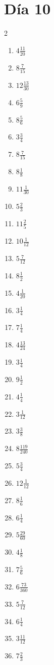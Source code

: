 \documentclass[12pt]{article}
\begin{document}
\section*{Día 10}
\begin{multicols}{2}\begin{enumerate}
\item $ 4 \frac{11}{20} $
\item $ 8 \frac{7}{15} $
\item $ 12 \frac{13}{30} $
\item $ 6 \frac{5}{9} $
\item $ 8 \frac{5}{6} $
\item $ 3 \frac{3}{4} $
\item $ 8 \frac{7}{15} $
\item $ 8 \frac{1}{8} $
\item $ 11 \frac{1}{30} $
\item $ 5 \frac{2}{3} $
\item $ 11 \frac{2}{5} $
\item $ 10 \frac{1}{12} $
\item $ 5 \frac{7}{12} $
\item $ 8 \frac{1}{2} $
\item $ 4 \frac{1}{20} $
\item $ 3 \frac{1}{4} $
\item $ 7 \frac{1}{4} $
\item $ 4 \frac{13}{24} $
\item $ 3 \frac{1}{4} $
\item $ 9 \frac{1}{2} $
\item $ 4 \frac{1}{4} $
\item $ 3 \frac{1}{12} $
\item $ 3 \frac{3}{8} $
\item $ 8 \frac{119}{240} $
\item $ 5 \frac{3}{4} $
\item $ 12 \frac{1}{12} $
\item $ 8 \frac{1}{6} $
\item $ 6 \frac{1}{4} $
\item $ 5 \frac{29}{60} $
\item $ 4 \frac{1}{8} $
\item $ 7 \frac{5}{6} $
\item $ 6 \frac{73}{360} $
\item $ 5 \frac{7}{12} $
\item $ 6 \frac{1}{4} $
\item $ 3 \frac{11}{12} $
\item $ 7 \frac{2}{3} $

\end{enumerate}
\end{multicols}
\end{document}
